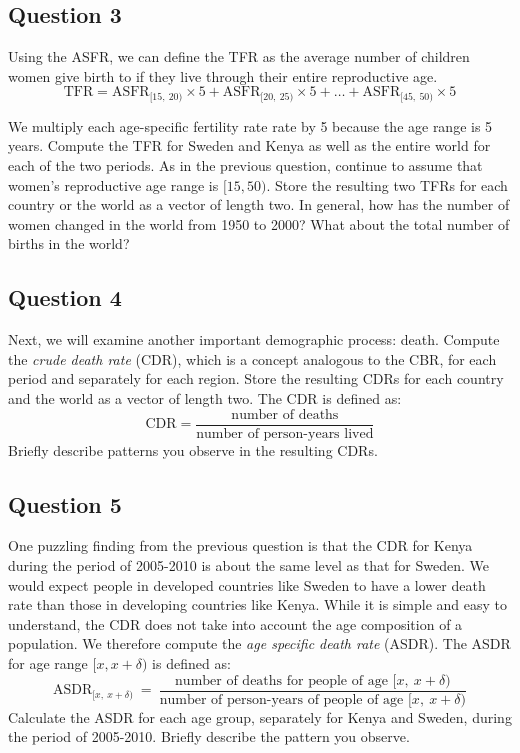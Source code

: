 \documentclass[]{article}
\begin{document}
\subsection{Question 3}\label{question-3}

Using the ASFR, we can define the TFR as the average number of children
women give birth to if they live through their entire reproductive age.
\[
  \text{TFR} 
   =   \text{ASFR}_{[15,\ 20)} \times 5 + \text{ASFR}_{[20,\ 25)} \times 5 
  + \dots + \text{ASFR}_{[45,\ 50)} \times 5
  \]

We multiply each age-specific fertility rate rate by 5 because the age
range is 5 years. Compute the TFR for Sweden and Kenya as well as the
entire world for each of the two periods. As in the previous question,
continue to assume that women's reproductive age range is $[15, 50)$.
Store the resulting two TFRs for each country or the world as a vector
of length two. In general, how has the number of women changed in the
world from 1950 to 2000? What about the total number of births in the
world?

\subsection{Question 4}\label{question-4}

Next, we will examine another important demographic process: death.
Compute the \emph{crude death rate} (CDR), which is a concept analogous
to the CBR, for each period and separately for each region. Store the
resulting CDRs for each country and the world as a vector of length two.
The CDR is defined as: \[ 
    \text{CDR} 
     =  \frac{\text{number of deaths}}{\text{number of person-years lived}}
  \] Briefly describe patterns you observe in the resulting CDRs.

\subsection{Question 5}\label{question-5}

One puzzling finding from the previous question is that the CDR for
Kenya during the period of 2005-2010 is about the same level as that for
Sweden. We would expect people in developed countries like Sweden to
have a lower death rate than those in developing countries like Kenya.
While it is simple and easy to understand, the CDR does not take into
account the age composition of a population. We therefore compute the
\emph{age specific death rate} (ASDR). The ASDR for age range
$[x, x+\delta)$ is defined as: \[
    \text{ASDR}_{[x,\ x+\delta)} 
    \ = \ \frac{\text{number of deaths for people of age $[x,\ x+\delta)$}}{\text{number of person-years of people of age $[x,\ x+\delta)$}}
  \] Calculate the ASDR for each age group, separately for Kenya and
Sweden, during the period of 2005-2010. Briefly describe the pattern you
observe.
\end{document}
